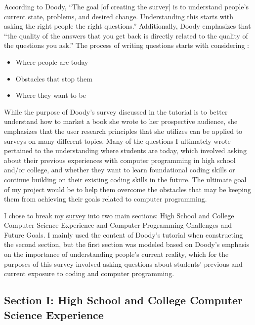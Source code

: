 \documentclass[10pt,twocolumn]{article}
\begin{document}
According to Doody, “The goal [of creating the survey] is to understand people’s current state, problems, and desired change. Understanding this starts with asking the right people the right questions.” Additionally, Doody emphasizes that “the quality of the answers that you get back is directly related to the quality of the questions you ask.” The process of writing questions starts with considering \cite{Tutorial}:
\begin{itemize}
    \item{Where people are today}
    \item{Obstacles that stop them}
    \item{Where they want to be}
\end{itemize}
While the purpose of Doody’s survey discussed in the tutorial is to better understand how to market a book she wrote to her prospective audience, she emphasizes that the user research principles that she utilizes can be applied to surveys on many different topics. Many of the questions I ultimately wrote pertained to the understanding where students are today, which involved asking about their previous experiences with computer programming in high school and/or college, and whether they want to learn foundational coding skills or continue building on their existing coding skills in the future. The ultimate goal of my project would be to help them overcome the obstacles that may be keeping them from achieving their goals related to computer programming.  
 
I chose to break my \href{https://forms.gle/5nDPNGqh9LwYLMVQ6}{survey} into two main sections: High School and College Computer Science Experience and Computer Programming Challenges and Future Goals. I mainly used the content of Doody’s tutorial when constructing the second section, but the first section was modeled based on Doody’s emphasis on the importance of understanding people’s current reality, which for the purposes of this survey involved asking questions about students’ previous and current exposure to coding and computer programming.

\subsection{Section I: High School and College Computer Science Experience}
\end{document}
